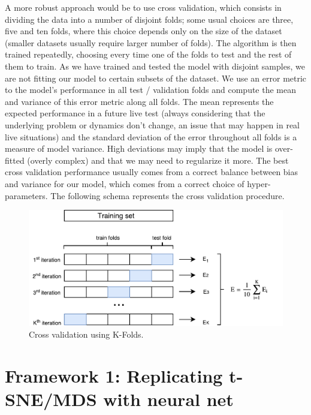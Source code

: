 \documentclass[a4paper,11pt,spanish]{report}
\begin{document}
A more robust approach would be to use cross validation, which consists in dividing the data into a number of disjoint folds; some usual choices are  three, five  and ten folds, where this choice depends only on the size of the dataset (smaller datasets usually require larger number of folds). The algorithm is then trained repeatedly, choosing every time one of the folds to test and the rest of them to train. As we have trained and tested the model with disjoint samples, we are not fitting our model to certain subsets of the dataset. We use an error metric to the model's performance in all test / validation folds and compute the mean and variance of this error metric along all folds. The mean represents the expected performance in a future live test (always considering that the underlying problem or dynamics don't change, an issue that may happen in real live situations) and the standard deviation of the error throughout all folds is a measure of model variance. High deviations may imply that the model is over-fitted (overly complex) and that we may need to regularize it more. The best cross validation performance usually comes from a correct balance between bias and variance for our model, which comes from a correct choice of hyper-parameters. The following schema represents the cross validation procedure.

\vspace{25px}

\begin{figure}[h]
\centering
\includegraphics[width=15cm]{figures/cv.pdf}
\caption{\label{figurefit}Cross validation using K-Folds.}
\end{figure}

\section{Framework 1: Replicating t-SNE/MDS with neural net}
\label{sec:app1}
\end{document}
